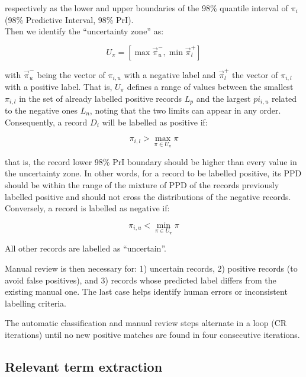 \documentclass{article}
\begin{document}
respectively as the lower and upper boundaries of the 98\% quantile
interval of \(\pi_i\) (98\% Predictive Interval, 98\% PrI).\\
Then we identify the ``uncertainty zone'' as:

\[U_\pi=[\max\vec{\pi}_{u}^-, \min\vec{\pi}_{l}^+]\]

with \(\vec{\pi}_{u}^-\) being the vector of \(\pi_{i,u}\) with a
negative label and \(\vec{\pi}_{l}^+\) the vector of \(\pi_{i,l}\) with
a positive label. That is, \(U_\pi\) defines a range of values between
the smallest \(\pi_{i,l}\) in the set of already labelled positive
records \(L_p\) and the largest \(pi_{i,u}\) related to the negative
ones \(L_n\), noting that the two limits can appear in any order.\\
Consequently, a record \(D_i\) will be labelled as positive if:

\[\pi_{i,l} > \max_{\pi \in U_\pi} \pi\]

that is, the record lower 98\% PrI boundary should be higher than every
value in the uncertainty zone. In other words, for a record to be
labelled positive, its PPD should be within the range of the mixture of
PPD of the records previously labelled positive and should not cross the
distributions of the negative records.\\
Conversely, a record is labelled as negative if:

\[\pi_{i,u} < \min_{\pi \in U_\pi} \pi\]

All other records are labelled as ``uncertain''.

Manual review is then necessary for: 1) uncertain records, 2) positive
records (to avoid false positives), and 3) records whose predicted label
differs from the existing manual one. The last case helps identify human
errors or inconsistent labelling criteria.

The automatic classification and manual review steps alternate in a loop
(CR iterations) until no new positive matches are found in four
consecutive iterations.

\hypertarget{relevant-term-extraction}{%
\subsection{Relevant term extraction}\label{relevant-term-extraction}}
\end{document}
